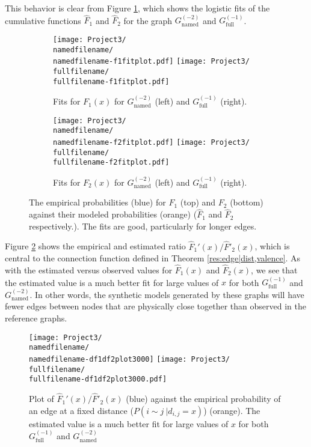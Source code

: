 \documentclass[11]{article}
\newcommand{\namedfilename}{namedminus2-2p}
\newcommand{\fullfilename}{fullminus1-2p}
\newcommand{\namedtwo}{G_{\textrm{named}}^{(-2)}}
\newcommand{\fullone}{G_{\textrm{full}}^{(-1)}}
\theoremstyle{remark}
\theoremstyle{definition}
\begin{document}
This behavior is clear from Figure \ref{fig:f1andf2fits}, which shows the logistic fits of the cumulative functions $\hat F_1$ and $\hat F_2$ for the graph $\namedtwo$ and $\fullone$.

\begin{figure}
\begin{subfigure}[t]{0.9\linewidth}
    \centering
         \texttt{[image: Project3/\\namedfilename/\\namedfilename-f1fitplot.pdf]}
     \quad \texttt{[image: Project3/\\fullfilename/\\fullfilename-f1fitplot.pdf]}
     \caption{Fits for $F_1(x)$ for $\namedtwo$ (left) and $\fullone$ (right).}
    \end{subfigure}
    
    \begin{subfigure}[t]{0.9\linewidth}
    \centering
         \texttt{[image: Project3/\\namedfilename/\\namedfilename-f2fitplot.pdf]}
     \quad \texttt{[image: Project3/\\fullfilename/\\fullfilename-f2fitplot.pdf]}
     \caption{Fits for $F_2(x)$ for $\namedtwo$ (left) and $\fullone$ (right).}
    \end{subfigure}
    
    \caption{The empirical probabilities (blue) for $F_1$ (top) and $F_2$ (bottom) against their modeled probabilities (orange) ($\hat F_1$ and  $\hat F_2$ respectively.). The fits are good, particularly for longer edges.  }
    \label{fig:f1andf2fits}
\end{figure}

Figure \ref{fig:df1df2fits} shows the empirical and estimated ratio $\hat F_1'(x)/ \hat F'_2(x)$, which is central to the connection function defined in Theorem \ref{res:edge|dist,valence}. As with the estimated versus observed values for $\hat F_1(x)$ and $\hat F_2(x)$, we see that the estimated value is a much better fit for large values of $x$ for both $\fullone$ and $\namedtwo$. In other words, the synthetic models generated by these graphs will have fewer edges between nodes that are physically close together than observed in the reference graphs. 

\begin{figure}
    \centering
         \texttt{[image: Project3/\\namedfilename/\\namedfilename-df1df2plot3000]}
     \quad \texttt{[image: Project3/\\fullfilename/\\fullfilename-df1df2plot3000.pdf]}
     \caption{Plot of $\hat F_1'(x)/ \hat F'_2(x)$ (blue) against the empirical probability of an edge at a fixed distance ($P(i \sim j~| d_{i,j}=x)$) (orange). The estimated value is a much better fit for large values of $x$ for both $\fullone$ and $\namedtwo$}

    \label{fig:df1df2fits}
\end{figure}
\end{document}

